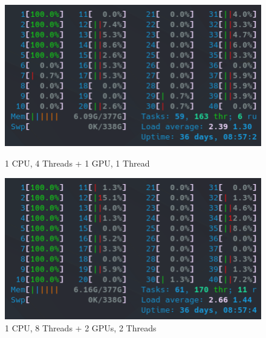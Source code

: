 \begin{figure}[!h]
    \centering
    \captionsetup{width=.48\linewidth}
    \begin{minipage}[t]{0.48\textwidth}
        \includegraphics[width=\textwidth]{figures/htop_hybrid/1CPU_4Threads___1GPU_1Thread.png}
        \caption{1 CPU, 4 Threads + 1 GPU, 1 Thread}\label{fig:1CPU_4Threads___1GPU_1Thread}
    \end{minipage}
    \hspace{0.4cm}
    \centering
    \captionsetup{width=.48\linewidth}
    \begin{minipage}[t]{0.48\textwidth}
        \includegraphics[width=\textwidth]{figures/htop_hybrid/1CPU_8Threads___2GPUs_2Threads.png}
        \caption{1 CPU, 8 Threads + 2 GPUs, 2 Threads}\label{fig:1CPU_8Threads___2GPUs_2Threads}
    \end{minipage}


\end{figure}
